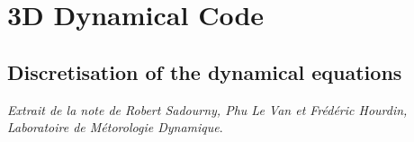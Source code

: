 \chapter{3D Dynamical Code}
\label{sc:dynamic}
\section{Discretisation of the dynamical equations}

\newcommand{\deriv}[1]{\frac{\partial }{\partial #1} }
\def\abs#1{\left| #1 \right|}
\renewcommand{\-}[1]{$^{-#1}$}

\newcommand{\dt}[1]{\frac{\partial #1}{\partial t}}
\newcommand{\dsig}[1]{\deriv{\sigma} \dep{#1} }
\newcommand{\diverg}[1]{\vec{\nabla}.\dep{#1 \vec{V}} }
\def\ps{p_s}
\def\t{\theta}
\def\w{\dot{\sigma}}
\def\cp{C_p}
\def\rcp{\kappa}

%
%

\newcommand{\adv}[1]{\diverg{\ps #1} + \dsig{\ps #1 \dot{\sigma}} }

\def\sc#1{Section~\ref{sc:#1}}
\def\an#1{Annexe~\ref{an:#1}}
\def\ch#1{Chapitre~\ref{ch:#1}}
\def\fig#1{Fig.~\ref{fg:#1}}
\def\figs#1{Figs.~\ref{fg:#1}}
\def\eq#1{Eq.~\ref{eq:#1}}
\def\eqs#1{Eqs.~\ref{eq:#1}}
\def\tb#1{Table~\ref{tb:#1}}
\def\cd{C_D}
\def\dx{\delta_X}
\def\dy{\delta_Y}
\def\dz{\delta_Z}

\def\filtre{{\cal F}}
\def\uabs{\tilde{u}_{a}}
\def\err{\epsilon}
\def\dsig{\dz \sigma}
\def\psk{{\ps}^\kappa}
\def\ucov{\tilde{u}}
\def\vcov{\tilde{v}}
\def\ucont{\tilde{\ucov}}
\def\vcont{\tilde{\vcov}}
\def\cu{c_u}
\def\cv{c_v}
\def\h{\theta}
\def\pext{\tilde{p}_s}
\def\fext{f}
\def\K{\frac{1}{2}
\left( \av{\ucov \ucont}{X} + \av{\vcov \vcont}{Y} \right)}
\def\Z{\frac{\filtre\dep{\dx \vcov - \dy \ucov} + \fext}{\av{\pext}{X,Y}}}
\def\Zm{\frac{- \dy \ucov + \fext}{\av{\pext}{Y}}}

\newcommand{\glob}[1]{ \left< #1 \right> }

{\it Extrait de la note de Robert Sadourny, Phu Le Van et Fr\'ed\'eric
Hourdin, Laboratoire de M\protect\'etorologie Dynamique}.\\

